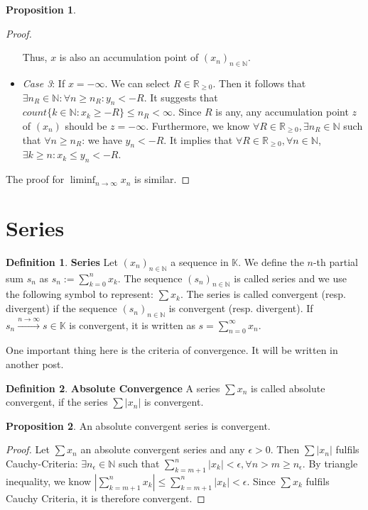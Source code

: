 \documentclass{article}
\theoremstyle{definition}
\newtheorem{defi}{Definition}[subsection]
\newtheorem{prop}{Proposition}[subsection]
\begin{document}
\begin{prop}
\begin{proof}
\begin{itemize}
    Thus, $x$ is also an accumulation point of $(x_n)_{n\in\mathbb{N}}$.
    \item \textit{Case 3}: If $x=-\infty$. We can select $R\in\mathbb{R}_{\geq0}$. Then it follows that $\exists n_R\in\mathbb{N}: \forall n\geq n_R: y_n < -R$. It suggests that $count\{k\in\mathbb{N}: x_k\geq -R\}\leq n_R < \infty$. Since $R$ is any, any accumulation point $z$ of $(x_n)$ should be $z=-\infty$. Furthermore, we know $\forall R\in\mathbb{R}_{\geq0}, \exists n_R\in\mathbb{N}$ such that $\forall n \geq n_R$: we have $y_n<-R$. It implies that $\forall R\in\mathbb{R}_{\geq0}, \forall n\in\mathbb{N}$, $\exists k\geq n: x_k\leq y_n < -R$.
\end{itemize}
The proof for $\liminf_{n\to\infty}x_n$ is similar.
\end{proof}
\end{prop}

\section{Series}
\begin{defi}
\textbf{Series} Let $(x_n)_{n\in\mathbb{N}}$ a sequence in $\mathbb{K}$. We define the $n$-th partial sum $s_n$ as $s_n := \sum_{k=0}^{n}x_k$. The sequence $(s_n)_{n\in\mathbb{N}}$ is called series and we use the following symbol to represent: $\sum x_k$. The series is called convergent (resp. divergent) if the sequence $(s_n)_{n\in\mathbb{N}}$ is convergent (resp. divergent). If $s_n \xrightarrow{n\to\infty}s\in\mathbb{K}$ is convergent, it is written as $s=\sum_{n=0}^{\infty}x_n$.
\end{defi}

One important thing here is the criteria of convergence. It will be written in another post.

\begin{defi}
\textbf{Absolute Convergence} A series $\sum x_n$ is called absolute convergent, if the series $\sum|x_n|$ is convergent. 
\end{defi}

\begin{prop}
An absolute convergent series is convergent.
\begin{proof}
    Let $\sum x_n$ an absolute convergent series and any $\epsilon>0$. Then $\sum |x_n|$ fulfils Cauchy-Criteria: $\exists n_\epsilon\in\mathbb{N}$ such that $\sum_{k=m+1}^{n}|x_k|<\epsilon, \forall n>m\geq n_\epsilon$. By triangle inequality, we know $|\sum_{k=m+1}^{n}x_k| \leq \sum_{k=m+1}^{n}|x_k|<\epsilon$. Since $\sum x_k$ fulfils Cauchy Criteria, it is therefore convergent. 
\end{proof}
\end{prop}
\end{document}
